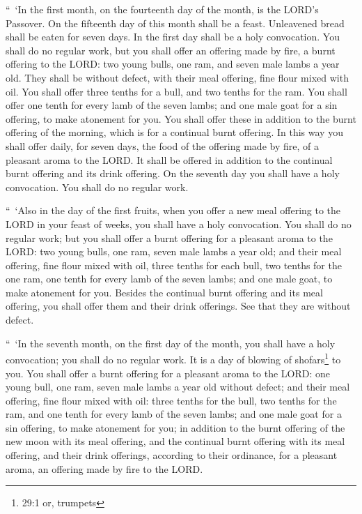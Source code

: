\myverse{}“ ‘In the first month, on the fourteenth day of the month, is
the LORD’s Passover.
\myverse{}On the fifteenth day of this month shall be a feast. Unleavened bread shall
be eaten for seven days.
\myverse{}In the first day shall be a holy convocation. You shall do no regular work,
\myverse{}but you shall offer an offering made by fire, a burnt offering to the LORD:
two young bulls, one ram, and seven male lambs a year old. They shall be without defect,
\myverse{}with their meal offering, fine flour mixed with oil. You shall offer three
tenths for a bull, and two tenths for the ram.
\myverse{}You shall offer one tenth for every lamb of the seven lambs;
\myverse{}and one male goat for a sin offering, to make atonement for you.
\myverse{}You shall offer these in addition to the burnt offering of the morning, which
is for a continual burnt offering.
\myverse{}In this way you shall offer daily, for seven days, the food of the offering
made by fire, of a pleasant aroma to the LORD. It shall be offered in addition to the continual burnt
offering and its drink offering.
\myverse{}On the seventh day you shall have a holy convocation. You shall do no regular
work.


\myverse{}“ ‘Also in the day of the first fruits, when you offer a new
meal offering to the LORD in your feast of weeks, you shall have a holy convocation. You shall do no regular
work;
\myverse{}but you shall offer a burnt offering for a pleasant aroma to the LORD: two
young bulls, one ram, seven male lambs a year old;
\myverse{}and their meal offering, fine flour mixed with oil, three tenths for each
bull, two tenths for the one ram,
\myverse{}one tenth for every lamb of the seven lambs;
\myverse{}and one male goat, to make atonement for you.
\myverse{}Besides the continual burnt offering and its meal offering, you shall offer
them and their drink offerings. See that they are without defect.


\mychapter{} \myverse*{}“ ‘In the seventh month, on the first day of the month, you shall
have a holy convocation; you shall do no regular work. It is a day of blowing of shofars\footnote{ 29:1 or, trumpets}
to you.
\myverse{}You shall offer a burnt offering for a pleasant aroma to the LORD: one young
bull, one ram, seven male lambs a year old without defect;
\myverse{}and their meal offering, fine flour mixed with oil: three tenths for the bull,
two tenths for the ram,
\myverse{}and one tenth for every lamb of the seven lambs;
\myverse{}and one male goat for a sin offering, to make atonement for you;
\myverse{}in addition to the burnt offering of the new moon with its meal offering, and
the continual burnt offering with its meal offering, and their drink offerings, according to their ordinance,
for a pleasant aroma, an offering made by fire to the LORD.


